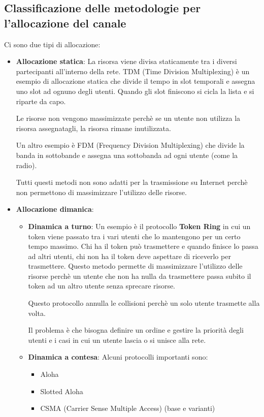 \documentclass[a4paper]{article}
\begin{document}
\subsection{Classificazione delle metodologie per l'allocazione del canale}
Ci sono due tipi di allocazione:
\begin{itemize}
  \item \textbf{Allocazione statica}: La risorsa viene divisa staticamente tra i diversi
    partecipanti all'interno della rete. TDM (Time Division Multiplexing) è un esempio
    di allocazione statica che divide il tempo in slot temporali e assegna uno slot ad
    ognuno degli utenti. Quando gli slot finiscono si cicla la lista e si riparte da
    capo.

    Le risorse non vengono massimizzate perchè se un utente non utilizza la risorsa
    assegnatagli, la risorsa rimane inutilizzata.

    \vspace{1em}
    \noindent
    Un altro esempio è FDM (Frequency Division Multiplexing) che divide la banda in
    sottobande e assegna una sottobanda ad ogni utente (come la radio).

    \vspace{1em}
    \noindent
    Tutti questi metodi non sono adatti per la trasmissione su Internet perchè non
    permettono di massimizzare l'utilizzo delle risorse.

  \item \textbf{Allocazione dimanica}:
    \begin{itemize}
      \item \textbf{Dinamica a turno}: Un esempio è il protocollo \textbf{Token Ring} in cui
        un token viene passato tra i vari utenti che lo mantengono per un certo tempo
        massimo. Chi ha il token può trasmettere e quando finisce lo passa ad altri utenti,
        chi non ha il token deve aspettare di riceverlo per trasmettere. Questo metodo 
        permette di massimizzare l'utilizzo delle risorse perchè un utente che non ha
        nulla da trasmettere passa subito il token ad un altro utente senza sprecare
        risorse.

        Questo protocollo annulla le collisioni perchè un solo utente trasmette alla
        volta.

        \vspace{1em}
        \noindent
        Il problema è che bisogna definire un ordine e gestire la priorità degli utenti
        e i casi in cui un utente lascia o si unisce alla rete.
      \item \textbf{Dinamica a contesa}: Alcuni protocolli importanti sono:
        \begin{itemize}
          \item Aloha
          \item Slotted Aloha
          \item CSMA (Carrier Sense Multiple Access) (base e varianti)
        \end{itemize}
    \end{itemize}
\end{itemize}
\end{document}
